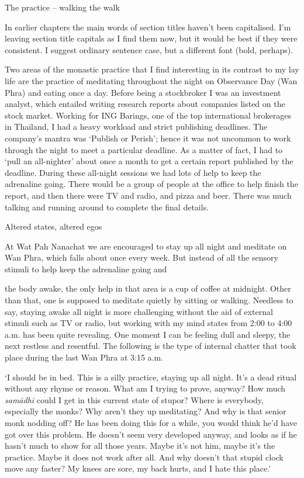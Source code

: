 The practice -- walking the walk

In earlier chapters the main words of section titles haven't been
capitalised. I'm leaving section title capitals as I find them now, but
it would be best if they were consistent. I suggest ordinary sentence
case, but a different font (bold, perhaps). 

Two areas of the monastic practice that I find interesting in its
contrast to my lay life are the practice of meditating throughout the
night on Observance Day (Wan Phra) and eating once a day. Before being a
stockbroker I was an investment analyst, which entailed writing research
reports about companies listed on the stock market. Working for ING
Barings, one of the top international brokerages in Thailand, I had a
heavy workload and strict publishing deadlines. The company's mantra was
`Publish or Perish'; hence it was not uncommon to work through the night
to meet a particular deadline. As a matter of fact, I had to `pull an
all-nighter' about once a month to get a certain report published by the
deadline. During these all-night sessions we had lots of help to keep
the adrenaline going. There would be a group of people at the office to
help finish the report, and then there were TV and radio, and pizza and
beer. There was much talking and running around to complete the final
details. 

Altered states, altered egos

At Wat Pah Nanachat we are encouraged to stay up all night and meditate
on Wan Phra, which falls about once every week. But instead of all the
sensory stimuli to help keep the adrenaline going and

the body awake, the only help in that area is a cup of coffee at
midnight. Other than that, one is supposed to meditate quietly by
sitting or walking. Needless to say, staying awake all night is more
challenging without the aid of external stimuli such as TV or radio, but
working with my mind states from 2:00 to 4:00 a.m. has been quite
revealing. One moment I can be feeling dull and sleepy, the next
restless and resentful. The following is the type of internal chatter
that took place during the last Wan Phra at 3:15 a.m.

`I should be in bed. This is a silly practice, staying up all night. 
It's a dead ritual without any rhyme or reason. What am I trying to
prove, anyway? How much \emph{samādhi} could I get in this current state
of stupor? Where is everybody, especially the monks? Why aren't they up
meditating? And why is that senior monk nodding off? He has been doing
this for a while, you would think he'd have got over this problem. He
doesn't seem very developed anyway, and looks as if he hasn't much to
show for all those years. Maybe it's not him, maybe it's the practice. 
Maybe it does not work after all. And why doesn't that stupid clock move
any faster? My knees are sore, my back hurts, and I hate this place.'

